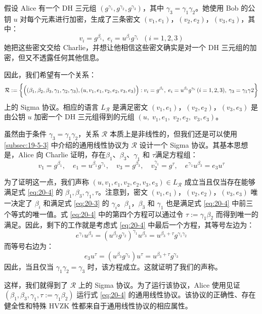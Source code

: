 \begin{example}\label{exmp:20-4}
假设 Alice 有一个 DH 三元组 $(g^{\gamma_1},g^{\gamma_2},g^{\gamma_3})$，其中 $\gamma_3=\gamma_1\gamma_2$。她使用 Bob 的公钥 $u$ 对每个元素进行加密，生成了三条密文 $(v_1,e_1)$，$(v_2,e_2)$，$(v_3,e_3)$，其中：
\begin{equation}\label{eq:20-3}
v_i=g^{\beta_i},\;
e_i=u^{\beta_i}g^{\gamma_i}\;\;
(i = 1,2,3)
\end{equation}
她把这些密文交给 Charlie，并想让他相信这些密文确实是对一个 DH 三元组的加密，但又不透露任何其他信息。

因此，我们希望有一个关系：
\[
\mathcal R:=
\bigg\lbrace
\Big((\beta_1,\beta_2,\beta_3,\gamma_1,\gamma_2,\gamma_3),(u,v_1,e_1,v_2,e_2,v_3,e_3)\Big):\\
v_i=g^{\beta_i},\;
e_i=u^{\beta_i}g^{\gamma_i}\,(i=1,2,3),\;
\gamma_3=\gamma_1\gamma2
\bigg\rbrace
\]
上的 Sigma 协议。相应的语言 $L_{\mathcal R}$ 是满足密文 $(v_1,e_1)$，$(v_2,e_2)$，$(v_3,e_3)$ 是由公钥 $u$ 加密一个 DH 三元组得到的元组 $(u,\;v_1,e_1,\;v_2,e_2,\;v_3,e_3)$。

虽然由于条件 $\gamma_3=\gamma_1\gamma_2$，关系 $\mathcal R$ 本质上是非线性的，但我们还是可以使用 \ref{subsec:19-5-3} 中介绍的通用线性协议为 $\mathcal R$ 设计一个 Sigma 协议。其基本思想是，Alice 向 Charlie 证明，存在$\beta_1$、$\beta_3$、$\gamma_1$ 和 $\tau$满足方程组：
\begin{equation}\label{eq:20-4}
v_1=g^{\beta_1},
\quad
e_1=u^{\beta_1}g^{\gamma_1},
\quad
v_3=g^{\beta_3},
\quad
v_2^{\gamma_1}=g^\tau,
\quad
e^{\gamma_1}u^{\beta_3}=e_3u^\tau
\end{equation}

为了证明这一点，我们声称 $(u,v_1,e_1,v_2,e_2,v_3,e_3)\in L_{\mathcal R}$ 成立当且仅当存在能够满足式 \ref{eq:20-4} 的 $\beta_1,\beta_3,\gamma_1,\tau$。注意到，密文 $(v_1,e_1)$，$(v_2,e_2)$，$(v_3,e_3)$ 唯一决定了 $\beta_i$ 和满足式 \ref{eq:20-3} 的 $\gamma_i$。$\beta_1$，$\beta_3$ 和 $\gamma_1$ 也是满足式 \ref{eq:20-4} 中前三个等式的唯一值。式 \ref{eq:20-4} 中的第四个方程可以通过令 $\tau:=\gamma_1\beta_2$ 而得到唯一的满足。因此，剩下的工作就是考虑式 \ref{eq:20-4} 中最后一个方程，其等号左边为：
\[
e^{\gamma_1}u^{\beta_3}=(u^{\beta_2}g^{\gamma_2})^{\gamma_1}u^{\beta_3}=u^{\beta_3+\tau}g^{\gamma_1\gamma_2}
\]
而等号右边为：
\[
e_3u^\tau=(u^{\beta_3}g^{\gamma_3})u^\tau =u^{\beta_3+\tau}g^{\gamma_3}
\]
因此，当且仅当 $\gamma_1\gamma_2=\gamma_3$ 时，该方程成立。这就证明了我们的声称。

这样，我们就得到了 $\mathcal R$ 上的 Sigma 协议。为了运行该协议，Alice 使用见证 $(\beta_1,\beta_3,\gamma_1,\tau:= \gamma_1\beta_2)$ 运行式 \ref{eq:20-4} 的通用线性协议。该协议的正确性、存在健全性和特殊 HVZK 性都来自于通用线性协议的相应属性。
\end{example}


